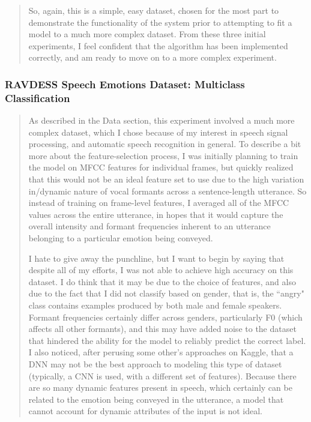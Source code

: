 \documentclass{article}
\begin{document}
\begin{quote}
 So, again, this is a simple, easy dataset, chosen for the most part to demonstrate the functionality of the system prior to attempting to fit a model to a much more complex dataset. From these three initial experiments, I feel confident that the algorithm has been implemented correctly, and am ready to move on to a more complex experiment.
\end{quote}

\subsubsection*{RAVDESS Speech Emotions Dataset: Multiclass Classification}
\begin{quote}
	\setlength{\parindent}{10ex}
	\quad\quad\quad\quad As described in the Data section, this experiment involved a much more complex dataset, which I chose because of my interest in speech signal processing, and automatic speech recognition in general. To describe a bit more about the feature-selection process, I was initially planning to train the model on MFCC features for individual frames, but quickly realized that this would not be an ideal feature set to use due to the high variation in/dynamic nature of vocal formants across a sentence-length utterance. So instead of training on frame-level features, I averaged all of the MFCC values across the entire utterance, in hopes that it would capture the overall intensity and formant frequencies inherent to an utterance belonging to a particular emotion being conveyed. 
	
	I hate to give away the punchline, but I want to begin by saying that despite all of my efforts, I was not able to achieve high accuracy on this dataset. I do think that it may be due to the choice of features, and also due to the fact that I did not classify based on gender, that is, the ``angry" class contains examples produced by both male and female speakers. Formant frequencies certainly differ across genders, particularly F0 (which affects all other formants), and this may have added noise to the dataset that hindered the ability for the model to reliably predict the correct label. I also noticed, after perusing some other's approaches on Kaggle, that a DNN may not be the best approach to modeling this type of dataset (typically, a CNN is used, with a different set of features). Because there are so many dynamic features present in speech, which certainly can be related to the emotion being conveyed in the utterance, a model that cannot account for dynamic attributes of the input is not ideal. 
	

\end{quote}
\end{document}
